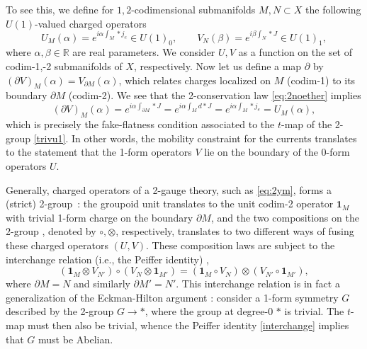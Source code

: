 \documentclass[onecolumn]{article}
\theoremstyle{theorem}
\theoremstyle{remark}
\theoremstyle{example}
\theoremstyle{definition}
\numberwithin{equation}{section}
\def\R{\mathbb{R}}
\begin{document}
    To see this, we define for $1,2$-codimensional submanifolds $M,N\subset X$ the following $U(1)$-valued charged operators
    \begin{equation*}
        U_M(\alpha) = e^{i\alpha\int_M\ast j_e}\in U(1)_0,\qquad V_N(\beta) = e^{i\beta\int_N \ast J}\in U(1)_1,
    \end{equation*}
    where $\alpha,\beta\in \R$ are real parameters. We consider $U,V$ as a function on the set of codim-1,-2 submanifolds of $X$, respectively. Now let us define a map $\partial$ by $(\partial V)_M(\alpha) = V_{\partial M}(\alpha)$, which relates charges localized on $M$ (codim-1) to its boundary $\partial M$ (codim-2). We see that the 2-conservation law \eqref{eq:2noether} implies
    \begin{equation*}
        (\partial V)_M(\alpha) = e^{i\alpha\int_{\partial M}\ast J}= e^{i\alpha\int_M d\ast J} = e^{i\alpha\int_M\ast j_e} = U_M(\alpha),
    \end{equation*}
    which is precisely the fake-flatness condition \cite{Bullivant:2016clk} associated to the $t$-map of the 2-group \eqref{trivu1}. In other words, the mobility constraint for the currents translates to the statement that the 1-form operators $V$ lie on the boundary of the 0-form operators $U$. 

    \smallskip
    
    Generally, charged operators of a 2-gauge theory, such as \eqref{eq:2ym}, forms a (strict) 2-group~\cite{Baez:2002highergauge,Wockel2008Principal2A}: the groupoid unit translates to the unit codim-2 {operator} %
 $\mathbf{1}_M$ with trivial 1-form charge on the boundary $\partial M$, and the two compositions on the 2-group \cite{baez2004}, denoted by $\circ,\otimes$, respectively, translates to two different ways of fusing these charged operators $(U,V)$. These composition laws are subject to the interchange relation (i.e., the Peiffer identity) \cite{baez2004,Porst2008Strict2A},
    \begin{equation}
        (\mathbf{1}_M\otimes V_{N'})\circ(V_N \otimes \mathbf{1}_{M'}) = (\mathbf{1}_M\circ V_N)\otimes (V_{N'}\circ\mathbf{1}_{M'}),\label{interchange}
    \end{equation}
    where $\partial M = N$ and similarly $\partial M' = N'$. This interchange relation is in fact a generalization of the Eckman-Hilton argument \cite{Gaiotto:2014kfa}: consider a 1-form symmetry $G$ described by the 2-group $G\rightarrow\ast$, where the group at degree-0 $\ast$ is trivial. The $t$-map must then also be trivial, whence the Peiffer identity \eqref{interchange} implies that $G$ must be Abelian.
\end{document}
